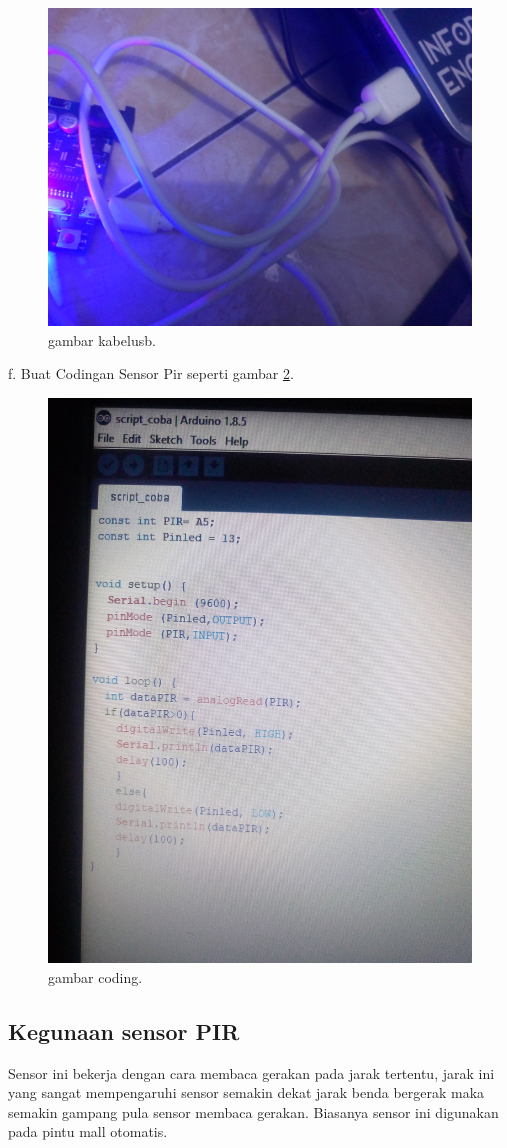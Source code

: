 \begin{figure} [ht]
\centerline{\includegraphics[width=1\textwidth]{figures/kabelusb.JPG}}
\caption{gambar kabelusb.}
\label{ckkabelusb}
\end{figure}

f. Buat Codingan Sensor Pir seperti gambar \ref{coding}.

\begin{figure} [ht]
\centerline{\includegraphics[width=1\textwidth]{figures/coding.JPG}}
\caption{gambar coding.}
\label{coding}
\end{figure}

\subsection {Kegunaan sensor PIR}
Sensor ini bekerja dengan cara membaca gerakan pada jarak tertentu, jarak ini yang sangat mempengaruhi sensor semakin dekat jarak benda bergerak maka semakin gampang pula sensor membaca gerakan.
Biasanya sensor ini digunakan pada pintu mall otomatis.
